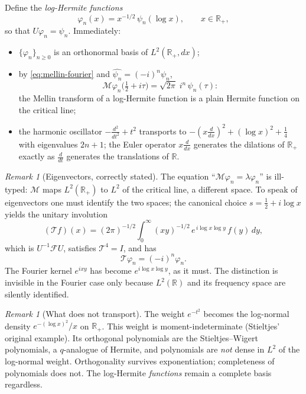 \documentclass[11pt]{article}
\theoremstyle{remark}
\newtheorem{remark}[proposition]{Remark}
\newcommand{\R}{\mathbb{R}}
\newcommand{\M}{\mathcal{M}}
\newcommand{\F}{\mathcal{F}}
\newcommand{\T}{\mathcal{T}}
\begin{document}
Define the \emph{log-Hermite functions}
\begin{equation}
\varphi_n(x) = x^{-1/2}\, \psi_n(\log x), \qquad x \in \R_+,
\end{equation}
so that $U\varphi_n = \psi_n$. Immediately:
\begin{itemize}
\item $\{\varphi_n\}_{n \ge 0}$ is an orthonormal basis of $L^2(\R_+, dx)$;
\item by \eqref{eq:mellin-fourier} and $\widehat{\psi_n} = (-i)^n\psi_n$,
\begin{equation}
\M\varphi_n\bigl(\tfrac12 + i\tau\bigr) = \sqrt{2\pi}\; i^n\, \psi_n(\tau):
\end{equation}
the Mellin transform of a log-Hermite function is a plain Hermite function on the critical line;
\item the harmonic oscillator $-\frac{d^2}{dt^2} + t^2$ transports to
$-(x\frac{d}{dx})^2 + (\log x)^2 + \frac14$ with eigenvalues $2n+1$; the Euler operator $x\frac{d}{dx}$ generates the dilations of $\R_+$ exactly as $\frac{d}{dt}$ generates the translations of $\R$.
\end{itemize}

\begin{remark}[Eigenvectors, correctly stated]
The equation ``$\M\varphi_n = \lambda\varphi_n$'' is ill-typed: $\M$ maps $L^2(\R_+)$ to $L^2$ of the critical line, a different space. To speak of eigenvectors one must identify the two spaces; the canonical choice $s = \tfrac12 + i\log x$ yields the unitary involution
\begin{equation}
(\T f)(x) = (2\pi)^{-1/2} \int_0^\infty (xy)^{-1/2}\, e^{\,i \log x \log y}\, f(y)\, dy,
\end{equation}
which is $U^{-1} \F U$, satisfies $\T^4 = I$, and has
\begin{equation}
\T \varphi_n = (-i)^n \varphi_n.
\end{equation}
The Fourier kernel $e^{ixy}$ has become $e^{i\log x \log y}$, as it must. The distinction is invisible in the Fourier case only because $L^2(\R)$ and its frequency space are silently identified.
\end{remark}

\begin{remark}[What does not transport]
The weight $e^{-t^2}$ becomes the log-normal density $e^{-(\log x)^2}/x$ on $\R_+$. This weight is moment-indeterminate (Stieltjes' original example). Its orthogonal polynomials are the Stieltjes--Wigert polynomials, a $q$-analogue of Hermite, and polynomials are \emph{not} dense in $L^2$ of the log-normal weight. Orthogonality survives exponentiation; completeness of polynomials does not. The log-Hermite \emph{functions} remain a complete basis regardless.
\end{remark}
\end{document}
